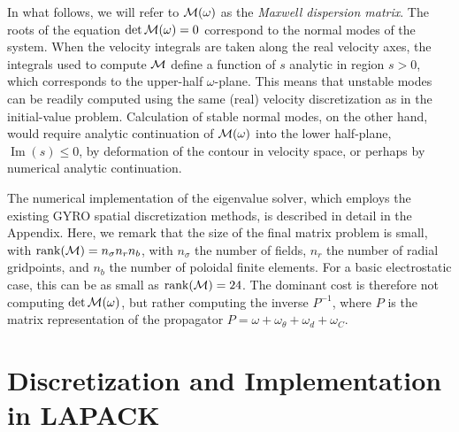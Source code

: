 %
In what follows, we will refer to ${\cal M}(\omega)$ as the 
{\it Maxwell dispersion matrix}.  The roots of the equation 
$\det{\cal M}(\omega) = 0$ correspond to the normal modes of the 
system.  When the velocity integrals are taken along the real velocity 
axes, the integrals used to compute ${\cal M}$ define 
a function of $s$ analytic in region $s > 0$, which corresponds to the 
upper-half $\omega$-plane.  This means that unstable modes can be readily 
computed using the same (real) velocity discretization as in the 
initial-value problem.  Calculation of stable normal modes, on the other 
hand, would require analytic continuation of ${\cal M}(\omega)$ 
into the lower half-plane, $\operatorname{Im}(s) \le 0$, by deformation 
of the contour in velocity space, or perhaps by numerical analytic 
continuation. 

The numerical implementation of the eigenvalue solver, which 
employs the existing GYRO spatial discretization methods, 
is described in detail in the Appendix.  Here, we remark that 
the size of the final matrix problem is small, with 
$\operatorname{rank}({\cal M}) = n_\sigma n_r n_b$, 
with $n_\sigma$ the number of fields, $n_r$ the 
number of radial gridpoints, and $n_b$ the number 
of poloidal finite elements.  For a basic electrostatic case, 
this can be as small as $\operatorname{rank}({\cal M}) = 24$.  
The dominant cost is therefore not computing $\det{\cal M}(\omega)$, 
but rather computing the inverse $P^{-1}$, where $P$ is the matrix 
representation of the propagator $P=\omega+\omega_\theta+\omega_d+\omega_C$.

\section{Discretization and Implementation in LAPACK}

